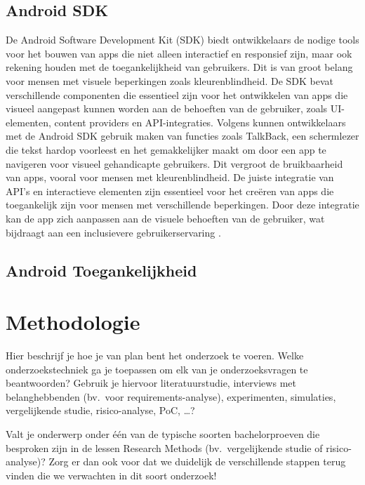 \subsection{Android SDK}
De Android Software Development Kit (SDK) biedt ontwikkelaars de nodige tools voor het bouwen 
van apps die niet alleen interactief en responsief zijn, maar ook rekening houden met 
de toegankelijkheid van gebruikers. Dit is van groot belang voor mensen met visuele beperkingen 
zoals kleurenblindheid. De SDK bevat verschillende componenten die essentieel zijn voor het 
ontwikkelen van apps die visueel aangepast kunnen worden aan de behoeften van de gebruiker, 
zoals UI-elementen, content providers en API-integraties. Volgens \textcite{Geeks2024} kunnen ontwikkelaars 
met de Android SDK gebruik maken van functies zoals TalkBack, een schermlezer die tekst hardop 
voorleest en het gemakkelijker maakt om door een app te navigeren voor visueel gehandicapte gebruikers. 
Dit vergroot de bruikbaarheid van apps, vooral voor mensen met kleurenblindheid. De juiste integratie 
van API's en interactieve elementen zijn essentieel voor het creëren van apps die toegankelijk zijn 
voor mensen met verschillende beperkingen. Door deze integratie kan de app zich aanpassen aan de 
visuele behoeften van de gebruiker, wat bijdraagt aan een inclusievere gebruikerservaring \autocite{Lee2011}.
\subsection{Android Toegankelijkheid}




\section{Methodologie}%
\label{sec:methodologie}

Hier beschrijf je hoe je van plan bent het onderzoek te voeren. Welke onderzoekstechniek ga je toepassen om elk van je onderzoeksvragen te beantwoorden? Gebruik je hiervoor literatuurstudie, interviews met belanghebbenden (bv.~voor requirements-analyse), experimenten, simulaties, vergelijkende studie, risico-analyse, PoC, \ldots?

Valt je onderwerp onder één van de typische soorten bachelorproeven die besproken zijn in de lessen Research Methods (bv.\ vergelijkende studie of risico-analyse)? Zorg er dan ook voor dat we duidelijk de verschillende stappen terug vinden die we verwachten in dit soort onderzoek!

